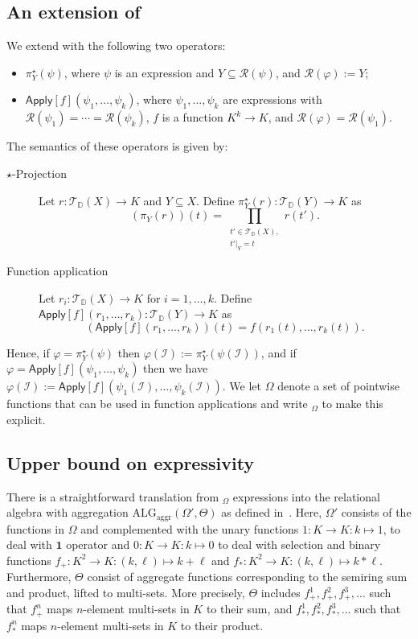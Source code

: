 \subsection{An extension of \ARA}
We extend \ARA with the following two operators:
\begin{itemize}
 \item $\pi_Y^\star(\psi)$, where $\psi$ is an \ARA expression and $Y \subseteq \mathcal{R}(\psi)$, and $\mathcal{R}(\varphi) := Y$;
 \item $\textsf{Apply}[f](\psi_1,\ldots,\psi_k)$, where $\psi_1,\ldots,\psi_k$ are \ARA expressions with $\mathcal{R}(\psi_1)=\cdots=\mathcal{R}(\psi_k)$, 
 $f$ is a function $K^k\to K$,
 and 
 $\mathcal{R}(\varphi)=\mathcal{R}(\psi_1)$.
\end{itemize}
The semantics of these operators is given by:
\begin{description}
\item[$\star$-Projection] Let $r: \mathcal{T}_{\mathbb{D}}(X) \to K$ and $Y \subseteq X$. Define $\pi_{Y}^\star(r): \mathcal{T}_{\mathbb{D}}(Y) \to K$ as
\[
(\pi_{Y}(r))(t) = \prod_{\substack{t' \in \mathcal{T}_{\mathbb{D}}(X),\\ t'|_{Y} = t}} \!\! r(t').
\]
\item[Function application] Let $r_{i}: \mathcal{T}_{\mathbb{D}}(X) \to K$ for $i=1,\ldots,k$. Define $\textsf{Apply}[f](r_1,\ldots,r_k): \mathcal{T}_{\mathbb{D}}(Y) \to K$ as
\[
(\textsf{Apply}[f](r_1,\ldots,r_k))(t) = f(r_1(t),\ldots,r_k(t)).
\]
\end{description}
Hence, if $\varphi=\pi^\star_{Y}(\psi)$ then 
$\varphi(\mathcal{I}):=\pi^\star_{Y}(\psi(\mathcal{I}))$, and
if $\varphi=\textsf{Apply}[f](\psi_1,\allowbreak \ldots,\psi_k)$ then we have
$\varphi(\mathcal{I}):=\textsf{Apply}[f](\psi_1(\mathcal{I}), \ldots,\psi_k(\mathcal{I}))$. We let $\Omega$ denote a set of pointwise functions that can be used in function applications and write \ARA$_\Omega$ to make this explicit.


\subsection{Upper bound on expressivity}
There is a straightforward translation from \ARA$_{\Omega}$ expressions into the relational algebra with aggregation $\text{ALG}_{\text{aggr}}(\Omega',\Theta)$ as defined in~\cite{LIBKIN2003}. Here, $\Omega'$ consists of the functions in $\Omega$ and complemented with the unary functions $1:K\to K:k\mapsto 1$, to deal with $\mathbf{1}$ operator and $0:K\to K:k\mapsto 0$ to deal with selection and binary functions $f_+:K^2\to K:(k,\ell)\mapsto k+\ell$ and $f_*:K^2\to K:(k,\ell)\mapsto k*\ell$.
Furthermore, $\Theta$ consist of aggregate functions corresponding to the semiring sum and product, lifted to multi-sets. More precisely,
$\Theta$ includes $f_+^1,f_+^2,f_+^3,\ldots$ such that $f_+^n$ maps
$n$-element multi-sets in $K$ to their sum, and 
 $f_*^1,f_*^2,f_*^3,\ldots$ such that $f_*^n$ maps
 $n$-element multi-sets in $K$ to their product.

